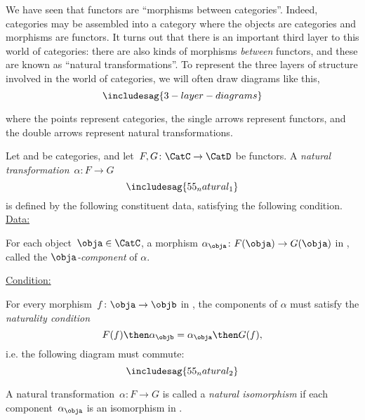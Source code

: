 
We have seen that functors are ``morphisms between categories''. Indeed, categories may be assembled into a category \Category where the objects are categories and morphisms are functors. It turns out that there is an important third layer to this world of categories: there are also kinds of morphisms \emph{between} functors, and these are known as ``natural transformations''. To represent the three layers of structure involved in the world of categories, we will often draw diagrams like this,
\begin{equation*}
  \includesag{3-layer-diagrams}
\end{equation*}


where the points represent categories, the single arrows represent functors, and the double arrows represent natural transformations.


\begin{ctdefinition}
  Let \CatC and \CatD be categories, and let~$F,G\colon \CatC\to \CatD$ be functors. A \emph{natural transformation}~$\alpha\colon F\to G$
  \begin{equation}
    \includesag{55_natural_1}
  \end{equation}
  is defined by the following constituent data, satisfying the following condition.
  \underline{Data:}
  \begin{compactenum}
    \item For each object~$\obja\in \CatC$, a morphism $\alpha_\obja \colon F(\obja)\to G(\obja)$ in \CatD, called the $\obja$\emph{-component} of $\alpha$.
  \end{compactenum}
  \underline{Condition:}
  \begin{compactenum}
    \item For every morphism~$f\colon \obja\to \objb$ in \CatC, the components of $\alpha$ must satisfy the \emph{naturality condition}
    \begin{equation}
      F(f)\then \alpha_\objb = \alpha_\obja\then G(f),
    \end{equation}
    i.e. the following diagram must commute:
    \begin{equation}
      \includesag{55_natural_2}
    \end{equation}
  \end{compactenum}
\end{ctdefinition}

\begin{ctdefinition}
  \label{def:nat_iso}
  A natural transformation~$\alpha\colon F\to G$ is called a \emph{natural isomorphism} if each component~$\alpha_\obja$ is an isomorphism in \CatD.
\end{ctdefinition}


